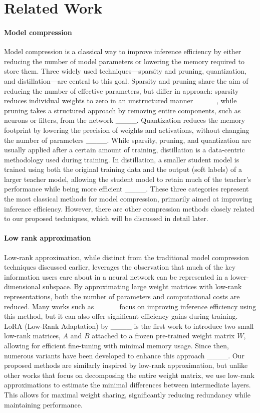 \section{Related Work}
\paragraph{Model compression} 
Model compression is a classical way to improve inference efficiency by either reducing the number of model parameters or lowering the memory required to store them. Three widely used techniques—sparsity and pruning, quantization, and distillation—are central to this goal. Sparsity and pruning share the aim of reducing the number of effective parameters, but differ in approach: sparsity reduces individual weights to zero in an unstructured manner ____, while pruning takes a structured approach by removing entire components, such as neurons or filters, from the network ____. Quantization reduces the memory footprint by lowering the precision of weights and activations, without changing the number of parameters ____. While sparsity, pruning, and quantization are usually applied after a certain amount of training, distillation is a data-centric methodology used during training. In distillation, a smaller student model is trained using both the original training data and the output (soft labels) of a larger teacher model, allowing the student model to retain much of the teacher’s performance while being more efficient ____. These three categories represent the most classical methods for model compression, primarily aimed at improving inference efficiency. However, there are other compression methods closely related to our proposed techniques, which will be discussed in detail later.

\paragraph{Low rank approximation} 
Low-rank approximation, while distinct from the traditional model compression techniques discussed earlier, leverages the observation that much of the key information users care about in a neural network can be represented in a lower-dimensional subspace. By approximating large weight matrices with low-rank representations, both the number of parameters and computational costs are reduced. Many works such as ____ focus on improving inference efficiency using this method, but it can also offer significant efficiency gains during training. LoRA (Low-Rank Adaptation) by ____ is the first work to introduce two small low-rank matrices, $A$ and $B$ attached to a frozen pre-trained weight matrix $W$, allowing for efficient fine-tuning with minimal memory usage. Since then, numerous variants have been developed to enhance this approach ____. Our proposed methods are similarly inspired by low-rank approximation, but unlike other works that focus on decomposing the entire weight matrix, we use low-rank approximations to estimate the minimal differences between intermediate layers. This allows for maximal weight sharing, significantly reducing redundancy while maintaining performance.

